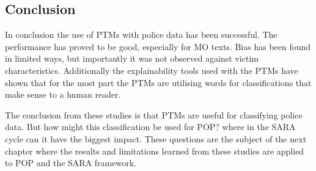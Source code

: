 \subsection{Conclusion} In conclusion the use of PTMs with police data has been successful. The performance has proved to be good, especially for MO texts. Bias has been found in limited ways, but importantly it was not observed against victim characteristics. Additionally the explainability tools used with the PTMs have shown that for the most part the PTMs are utilising words for classifications that make sense to a human reader.

The conclusion from these studies is that PTMs are useful for classifying police data. But how might this classification be used for POP? where in the SARA cycle can it have the biggest impact. These questions are the subject of the next chapter where the results and limitations learned from these studies are applied to POP and the SARA framework.


